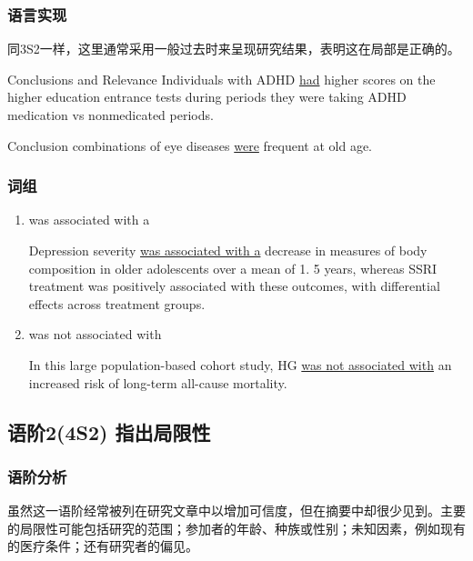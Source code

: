 \documentclass[a4paper]{ctexbook}
\begin{document}
    \subsubsection{语言实现}

    同3S2一样，这里通常采用一般过去时来呈现研究结果，表明这在局部是正确的。

    \begin{eg}{}
      Conclusions and Relevance Individuals with ADHD \uline{had} higher scores on the higher education entrance tests during periods they were taking ADHD medication vs nonmedicated periods.
    \end{eg}

    \begin{eg}{}
      Conclusion combinations of eye diseases \uline{were} frequent at old age. 
    \end{eg}

    \subsubsection{词组}

    \begin{enumerate}
      \item was associated with a
      \begin{eg}{}
        Depression severity \uline{was associated with a} decrease in measures of body composition in older adolescents over a mean of 1. 5 years, whereas SSRI treatment was positively associated with these outcomes, with differential effects across treatment groups.
      \end{eg}
      \item was not associated with
      \begin{eg}{}
        In this large population-based cohort study, HG \uline{was not associated with} an increased risk of long-term all-cause mortality.
      \end{eg}
    \end{enumerate}

  \subsection{语阶2(4S2) 指出局限性}
    \subsubsection{语阶分析}

    虽然这一语阶经常被列在研究文章中以增加可信度，但在摘要中却很少见到。主要的局限性可能包括研究的范围；参加者的年龄、种族或性别；未知因素，例如现有的医疗条件；还有研究者的偏见。
\end{document}
